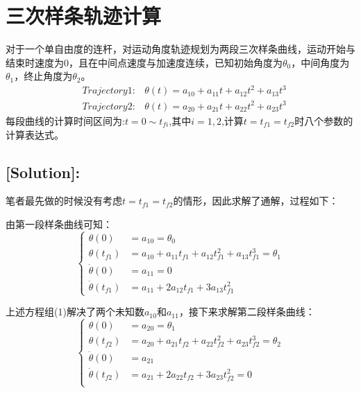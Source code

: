 \documentclass{ctexart}
\begin{document}



\newpage


\newpage
\pagestyle{fancy}
\fancyhf{}
\fancyfoot[C]{\thepage}
\section{三次样条轨迹计算}
对于一个单自由度的连杆，对运动角度轨迹规划为两段三次样条曲线，运动开始与结束时速度为0，且在中间点速度与加速度连续，已知初始角度为$\theta_0$，中间角度为$\theta_1$，终止角度为$\theta_2$。
\begin{equation*}
	\begin{aligned}
		&Trajectory1: & \theta(t) = a_{10} + a_{11}t + a_{12}t^2 + a_{13}t^3 \\
		&Trajectory2: & \theta(t) = a_{20} + a_{21}t + a_{22}t^2 + a_{23}t^3	
	\end{aligned}
\end{equation*}
每段曲线的计算时间区间为:$t=0 \sim t_{fi}$,其中$i=1,2$,计算$t=t_{f1}=t_{f2}$时八个参数的计算表达式。

\subsection*{[Solution]:}
笔者最先做的时候没有考虑$t=t_{f1}=t_{f2}$的情形，因此求解了通解，过程如下：

由第一段样条曲线可知：
\begin{equation}
	\left\{
		\begin{aligned}
			\theta(0) &= a_{10} = \theta_0 \\
			\theta(t_{f1}) &= a_{10} + a_{11}t_{f1} + a_{12}t_{f1}^2 + a_{13}t_{f1}^3 = \theta_1 \\
			\dot{\theta}(0) &= a_{11} = 0 \\
			\dot{\theta}(t_{f1}) &= a_{11} + 2a_{12}t_{f1} + 3a_{13}t_{f1}^2
		\end{aligned}
	\right.
\end{equation}

上述方程组(1)解决了两个未知数$a_{10}$和$a_{11}$，接下来求解第二段样条曲线：
\begin{equation}
	\left\{
		\begin{aligned}
			\theta(0)&=a_{20}=\theta_1 \\
			\theta(t_{f2})&=a_{20}+a_{21}t_{f2}+a_{22}t_{f2}^2+a_{23}t_{f2}^3=\theta_2 \\
			\dot{\theta}(0)&=a_{21}\\
			\dot{\theta}(t_{f2})&=a_{21}+2a_{22}t_{f2}+3a_{23}t_{f2}^2=0\\
		\end{aligned}
	\right.
\end{equation}
\end{document}

